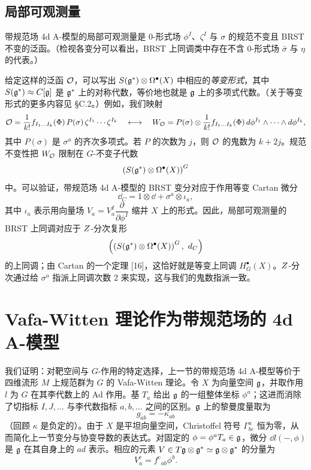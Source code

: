 \subsection{局部可观测量}

带规范场 4d A-模型的局部可观测量是 0-形式场 $\phi^I$、$\zeta^I$ 与 $\sigma$ 的规范不变且 BRST 不变的泛函。（检视各变分可以看出，BRST 上同调类中存在不含 0-形式场 $\bar\sigma$ 与 $\eta$ 的代表。）

给定这样的泛函 $\mathcal{O}$，可以写出 $S(\mathfrak{g}^*)\otimes\Omega^\bullet(X)$ 中相应的\emph{等变形式}，其中 $S(\mathfrak{g}^*)\approx C[\mathfrak{g}]$ 是 $\mathfrak{g}^*$ 上的对称代数，等价地也就是 $\mathfrak{g}$ 上的多项式代数。（关于等变形式的更多内容见 §C.2。）例如，我们映射
\[
  \mathcal{O}=\frac{1}{k!}f_{I_1\ldots I_k}(\Phi)\,P(\sigma)\,\zeta^{I_1}\cdots\zeta^{I_k}
  \quad\longleftrightarrow\quad
  W_{\mathcal{O}}=P(\sigma)\otimes\frac{1}{k!}f_{I_1\ldots I_k}(\Phi)\,d\phi^{I_1}\wedge\cdots\wedge d\phi^{I_k},
\]
其中 $P(\sigma)$ 是 $\sigma^a$ 的齐次多项式。若 $P$ 的次数为 $j$，则 $\mathcal{O}$ 的鬼数为 $k+2j$。规范不变性把 $W_{\mathcal{O}}$ 限制在 $G$-不变子代数
\[
  \left(S(\mathfrak{g}^*)\otimes\Omega^\bullet(X)\right)^G
\]
中。可以验证，带规范场 4d A-模型的 BRST 变分对应于作用等变 Cartan 微分
\[
  \dd_C=1\otimes\dd+\sigma^a\otimes\iota_a,
\]
其中 $\iota_a$ 表示用向量场 $V_a=V^I_a\dfrac{\partial}{\partial\phi^I}$ 缩并 $X$ 上的形式。因此，局部可观测量的 BRST 上同调对应于 $Z$-分次复形
\[
  \left(\left(S(\fg^*)\otimes\Omega^\bullet(X)\right)^G,\ \dd_C\right)
\]
的上同调；由 Cartan 的一个定理 [16]，这恰好就是等变上同调 $H^\bullet_G(X)$。$Z$-分次通过给 $\sigma^a$ 指派上同调次数 2 来实现，这与我们的鬼数指派一致。


\section{Vafa-Witten 理论作为带规范场的 4d A-模型}

我们证明：对靶空间与 $G$-作用的特定选择，上一节的带规范场 4d A-模型等价于四维流形 $M$ 上规范群为 $G$ 的 Vafa-Witten 理论。令 $X$ 为向量空间 $\mathfrak{g}$，并取作用 $l$ 为 $G$ 在其李代数上的 Ad 作用。基 $T_a$ 给出 $\mathfrak{g}$ 的一组整体坐标 $\phi^a$；这进而消除了切指标 $I,J,\ldots$ 与李代数指标 $a,b,\ldots$ 之间的区别。$\mathfrak{g}$ 上的黎曼度量取为
\[
  g_{ab}=-\kappa_{ab}
\]
（回顾 $\kappa$ 是负定的）。由于 $X$ 是平坦向量空间，Christoffel 符号 $\Gamma^a_{bc}$ 恒为零，从而简化上一节变分与协变导数的表达式。对固定的 $\phi=\phi^aT_a\in\mathfrak{g}$，微分 $\dd l(-,\phi)$ 是 $\mathfrak{g}$ 在其自身上的 $\mathit{ad}$ 表示。相应的元素 $V\in T\mathfrak{g}\otimes\mathfrak{g}^*\simeq\mathfrak{g}\otimes\mathfrak{g}^*$ 的分量为
\[
  V^c_a=f^c{}_{ab}\phi^b.
\]

